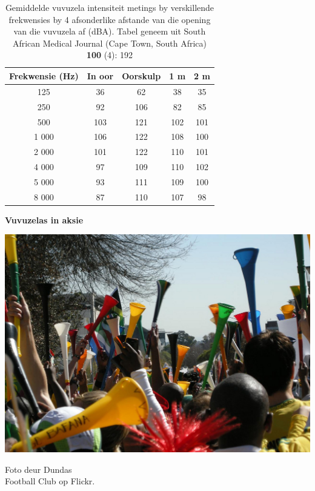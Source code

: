 \begin{minipage}{.5\textwidth}
\begin{table}[H]
\begin{tabular}{ccccc}\hline
Frekwensie (Hz) & In oor & Oorskulp & 1 m & 2 m \\ \hline
125&   36  	&62	 &38	& 35 \\ \hline
250&	92 &	106	& 82	&	 85 \\ \hline
500&	103 & 121&	 102&	 101 		\\ \hline
1 000&	106 & 122&	 108&	 100 	\\  \hline
2 000&	101 & 122&	 110&	 101 	\\ \hline
4 000&	97 & 109&	 110&	 102 	\\ \hline
5 000&	93 & 111&	 109&	 100 		\\ \hline
8 000&  87 & 110&	 107&		 98 	\\ \hline
\end{tabular}
\label{table:vuvuzelas}
\caption{Gemiddelde vuvuzela intensiteit metings by verskillende frekwensies by 4 afsonderlike afstande van die opening van die vuvuzela af (dBA). Tabel geneem uit South African Medical Journal (Cape Town, South Africa) \textbf{100} (4): 192}
\end{table}
\end{minipage}
\begin{minipage}{.5\textwidth}
\begin{center}
\textbf{Vuvuzelas in aksie}\par
\includegraphics[width=.6\columnwidth]{../Grade10/photos/vuvuzelas_dundas_football_club.jpg}\par
Foto deur Dundas \\Football Club op Flickr.	
\end{center}
\end{minipage}

            
